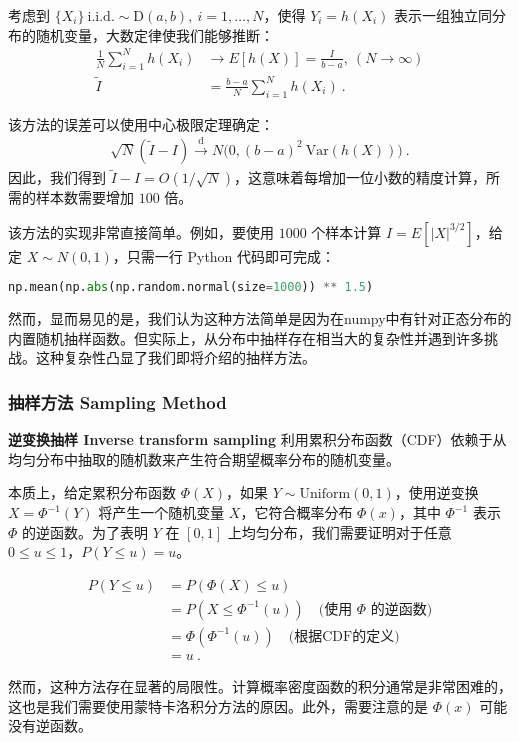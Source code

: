 考虑到 \(\{ X_i\} \ \text{i.i.d.}  \sim \text{D}(a,b), \ i=1,\ldots,N \)，使得 \(Y_i = h(X_i)\) 表示一组独立同分布的随机变量，大数定律使我们能够推断：
\begin{align} 
\frac{1}{N} \sum_{i=1}^N h(X_i) & \to E [h(X)] = \frac{I}{b-a}, \ (N \to \infty)\\
\tilde I &= \frac{b-a}{N} \sum_{i=1}^N h(X_i)~.
\end{align}

该方法的误差可以使用中心极限定理确定：
\begin{align} \sqrt{N}(\tilde I - I) \stackrel{\mbox{d}}{\longrightarrow} N\big(0, (b-a)^2 \ \text{Var}(h(X)) \big)~.\end{align}
因此，我们得到 \(\tilde I - I = O(1/\sqrt{N})\)，这意味着每增加一位小数的精度计算，所需的样本数需要增加 $100$ 倍。

该方法的实现非常直接简单。例如，要使用 $1000$ 个样本计算 \(I = E [|X|^{3/2}]\)，给定 \(X \sim N(0,1)\)，只需一行 Python 代码即可完成：
\begin{lstlisting}[language=python]
np.mean(np.abs(np.random.normal(size=1000)) ** 1.5)
\end{lstlisting}
然而，显而易见的是，我们认为这种方法简单是因为在numpy中有针对正态分布的内置随机抽样函数。但实际上，从分布中抽样存在相当大的复杂性并遇到许多挑战。这种复杂性凸显了我们即将介绍的抽样方法。

\subsubsection{抽样方法 Sampling Method }
\textbf{逆变换抽样 Inverse transform sampling }利用累积分布函数（CDF）依赖于从均匀分布中抽取的随机数来产生符合期望概率分布的随机变量。

本质上，给定累积分布函数 \(\Phi(X) \)，如果 \( Y \sim \text{Uniform}(0, 1) \)，使用逆变换 \( X = \Phi^{-1}(Y) \) 将产生一个随机变量 \( X \)，它符合概率分布 \(\Phi(x)\)，其中 \( \Phi^{-1} \) 表示 \(\Phi\) 的逆函数。为了表明 \(Y\) 在 \([0, 1]\) 上均匀分布，我们需要证明对于任意 \(0 \leq u \leq 1\)，\(P(Y \leq u) = u\)。

\begin{align}
P(Y \leq u) &= P(\Phi(X) \leq u) \\
&= P(X \leq \Phi^{-1}(u)) \quad \text{(使用 } \Phi \text{ 的逆函数)} \\
&= \Phi(\Phi^{-1}(u)) \quad \text{(根据CDF的定义)} \\
&= u
~.
\end{align}

然而，这种方法存在显著的局限性。计算概率密度函数的积分通常是非常困难的，这也是我们需要使用蒙特卡洛积分方法的原因。此外，需要注意的是 \( \Phi(x) \) 可能没有逆函数。


